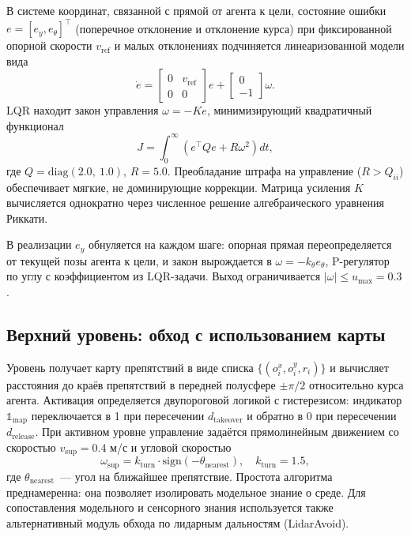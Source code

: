 \documentclass[11pt]{article}
\begin{document}
В системе координат, связанной с прямой от агента к цели, состояние
ошибки $e = [e_y, e_\theta]^\top$ (поперечное отклонение и отклонение
курса) при фиксированной опорной скорости $v_{\mathrm{ref}}$ и малых
отклонениях подчиняется линеаризованной модели вида
\begin{equation}
\label{eq:lqr_model}
\dot{e} = \begin{bmatrix} 0 & v_{\mathrm{ref}} \\ 0 & 0 \end{bmatrix} e
         + \begin{bmatrix} 0 \\ -1 \end{bmatrix} \omega.
\end{equation}
LQR находит закон управления $\omega = -K e$, минимизирующий
квадратичный функционал
\begin{equation}
J = \int_0^\infty \left( e^\top Q e + R \omega^2 \right) dt,
\end{equation}
где $Q = \mathrm{diag}(2.0,\ 1.0)$, $R = 5.0$. Преобладание штрафа
на управление ($R > Q_{ii}$) обеспечивает мягкие, не доминирующие
коррекции. Матрица усиления $K$ вычисляется однократно через численное
решение алгебраического уравнения Риккати.

В реализации $e_y$ обнуляется на каждом шаге: опорная прямая переопределяется от текущей позы агента к цели, и закон вырождается в $\omega = -k_\theta e_\theta$, P-регулятор по углу с коэффициентом из LQR-задачи. Выход ограничивается $|\omega| \leq u_{\max} = 0.3$.


\subsection{Верхний уровень: обход с использованием карты}
\label{sec:supervisory}

Уровень получает карту препятствий в виде списка $\{(o^x_i, o^y_i, r_i)\}$ и вычисляет расстояния до краёв препятствий в передней полусфере $\pm \pi/2$ относительно курса агента. Активация определяется двупороговой логикой с гистерезисом: индикатор $\mathbb{1}_{\text{map}}$ переключается в 1 при пересечении $d_{\text{takeover}}$ и обратно в 0 при пересечении $d_{\text{release}}$. При активном уровне управление задаётся прямолинейным движением со скоростью $v_{\mathrm{sup}} = 0.4$ м/с и угловой скоростью
\begin{equation}
\omega_{\mathrm{sup}} = k_{\mathrm{turn}} \cdot \mathrm{sign}(-\theta_{\mathrm{nearest}}),\quad k_{\mathrm{turn}} = 1.5,
\end{equation}
где $\theta_{\mathrm{nearest}}$~--- угол на ближайшее препятствие. Простота алгоритма преднамеренна: она позволяет изолировать модельное знание о среде. Для сопоставления модельного и сенсорного знания используется также альтернативный модуль обхода по лидарным дальностям (LidarAvoid).
\end{document}
